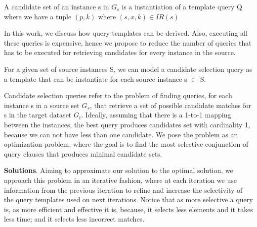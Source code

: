 \begin{definition}   A candidate set of an instance s in $G_s$ is a instantiation of a template query Q where we have a tuple $(p,k)$ where $(s,x,k) \in IR(s)$
\end{definition} 
In this work, we discuss how query templates can be derived. Also, executing all these queries is expensive, hence we propose to reduce the number of queries that has to be executed for retrieving candidates for every instance in the source.



For a given set of source instances S, we can model a candidate selection query as a template that can be instantiate for each source instance s $\in$ S.


Candidate selection queries refer to the problem of finding queries, for each instance s in a source set $G_s$, that retrieve a set of possible candidate matches for s in the target dataset $G_t$.  Ideally, assuming that there is a 1-to-1 mapping between the instances, the best query produces candidates set with cardinality 1, because we can not have less than one candidate. We pose the problem as an optimization problem, where the goal is to find the most selective conjunction of query clauses that produces minimal candidate sets.




\textbf{Solutions}. Aiming to approximate our solution to the optimal solution, we approach this problem in an iterative fashion, where at each iteration we use information from the previous iteration to refine and increase the selectivity of the query templates used on next iterations. Notice that as more selective a query is, as more efficient and effective it is, because, it selects less elements and it takes less time; and it selects less incorrect matches.  

